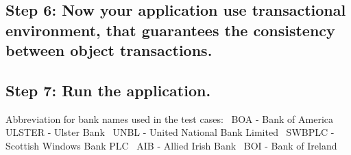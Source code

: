 \hypertarget{index_step6}{}\subsection{Step 6\+: Now your application use transactional environment, that guarantees the consistency between object transactions.}\label{index_step6}
\hypertarget{index_step7}{}\subsection{Step 7\+: Run the application.}\label{index_step7}
Abbreviation for bank names used in the test cases\+:~\newline
 B\+OA -\/ Bank of America~\newline
 U\+L\+S\+T\+ER -\/ Ulster Bank~\newline
 U\+N\+BL -\/ United National Bank Limited~\newline
 S\+W\+B\+P\+LC -\/ Scottish Windows Bank P\+LC~\newline
 A\+IB -\/ Allied Irish Bank~\newline
 B\+OI -\/ Bank of Ireland~\newline
 